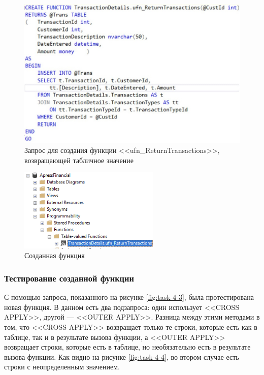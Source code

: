 \documentclass[a4paper, 14pt]{extarticle}
\begin{document}
\begin{figure}[H]
  \centering
  \includegraphics[width=\textwidth]{images/task-4/1.png}
  \caption{
    Запрос для создания функции
    <<\foreignlanguage{english}{ufn\_ReturnTransactions}>>, возвращающей
    табличное значение
  }
  \label{fig:task-4-1}
\end{figure}

\begin{figure}[H]
  \centering
  \includegraphics[width=0.6\textwidth]{images/task-4/2.png}
  \caption{Созданная функция}
  \label{fig:task-4-2}
\end{figure}

\subsubsection{Тестирование созданной функции}

С помощью запроса, показанного на рисунке \ref{fig:task-4-3}, была
протестирована новая функция. В данном есть два подзапроса: один использует
<<\foreignlanguage{english}{CROSS APPLY}>>, другой ---
<<\foreignlanguage{english}{OUTER APPLY}>>. Разница между этими методами в том,
что <<\foreignlanguage{english}{CROSS APPLY}>> возвращает только те строки,
которые есть как в таблице, так и в результате вызова функции, а
<<\foreignlanguage{english}{OUTER APPLY}>> возвращает строки, которые есть в
таблице, но необязательно есть в результате вызова функции. Как видно на рисунке
\ref{fig:task-4-4}, во втором случае есть строки с неопределенным значением.
\end{document}
